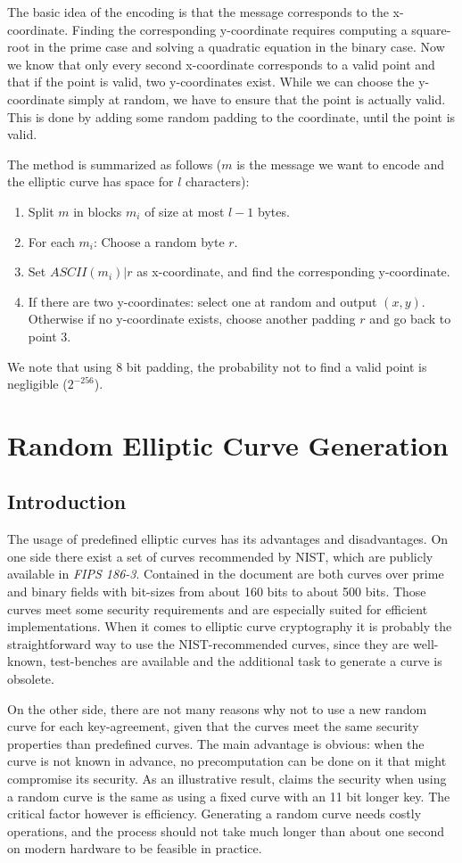 \documentclass[11pt,english]{article}
\begin{document}
The basic idea of the encoding is that the message corresponds to the x-coordinate. Finding the corresponding y-coordinate requires computing a square-root in the prime case and solving a quadratic equation in the binary case. Now we know that only every second x-coordinate corresponds to a valid point and that if the point is valid, two y-coordinates exist. While we can choose the y-coordinate simply at random, we have to ensure that the point is actually valid. This is done by adding some random padding to the coordinate, until the point is valid.

The method is summarized as follows ($m$ is the message we want to encode and the elliptic curve has space for $l$ characters):
\begin{enumerate}
 \item Split $m$ in blocks $m_i$ of size at most $l-1$ bytes.
 \item For each $m_i$: Choose a random byte $r$.
 \item Set $ASCII(m_i)|r$ as x-coordinate, and find the corresponding y-coordinate.
 \item If there are two y-coordinates: select one at random and output $(x,y)$. Otherwise if no y-coordinate exists, choose another padding $r$ and go back to point 3.
\end{enumerate}
We note that using 8 bit padding, the probability not to find a valid point is negligible ($2^{-256}$).


\section{Random Elliptic Curve Generation}
\subsection{Introduction}
The usage of predefined elliptic curves has its advantages and disadvantages. On one side there exist a set of curves recommended by NIST, which are publicly available in \emph{FIPS 186-3}.
Contained in the document are both curves over prime and binary fields with bit-sizes from about 160 bits to about 500 bits. Those curves meet some security requirements and are especially suited for efficient implementations.
When it comes to elliptic curve cryptography it is probably the straightforward way to use the NIST-recommended curves, since they are well-known, test-benches are available and the additional task to generate a curve is obsolete.

On the other side, there are not many reasons why not to use a new random curve for each key-agreement, given that the curves meet the same security properties than predefined curves.
The main advantage is obvious: when the curve is not known in advance, no precomputation can be done on it that might compromise its security. As an illustrative result, \cite{fixed} claims the security when using a random curve is the same as using a fixed curve with an 11 bit longer key.
The critical factor however is efficiency. Generating a random curve needs costly operations, and the process should not take much longer than about one second on modern hardware to be feasible in practice.
\end{document}

